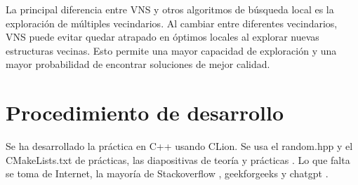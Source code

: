 La principal diferencia entre VNS y otros algoritmos de búsqueda local es la exploración de múltiples vecindarios. Al cambiar entre diferentes vecindarios, VNS puede evitar quedar atrapado en óptimos locales al explorar nuevas estructuras vecinas. Esto permite una mayor capacidad de exploración y una mayor probabilidad de encontrar soluciones de mejor calidad.\\

\section{Procedimiento de desarrollo}
Se ha desarrollado la práctica en C++ usando CLion.  Se usa el random.hpp y el CMakeLists.txt de prácticas, las diapositivas de teoría y prácticas \cite{prado}. Lo que falta se toma de Internet, la mayoría de Stackoverflow \cite{Stackoverflow}, geekforgeeks \cite{greekforgeeks} y chatgpt \cite{chatgpt}. \\

